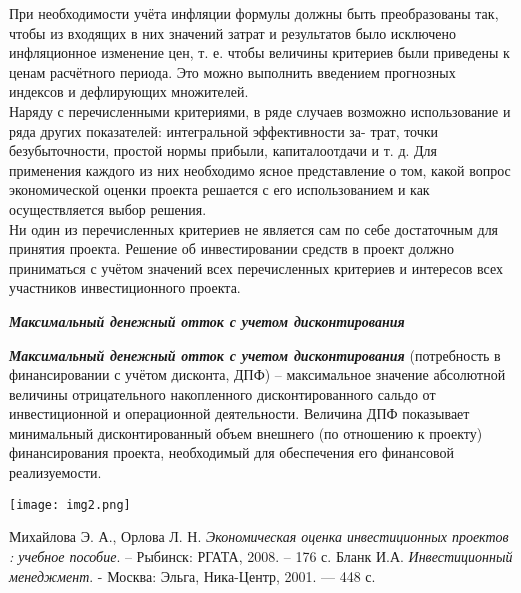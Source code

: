 \documentclass[a4paper,12pt]{article}
\begin{document}
При необходимости учёта инфляции формулы должны быть преобразованы так, чтобы из входящих в них значений затрат и результатов было исключено инфляционное изменение цен, т. е. чтобы величины критериев были приведены к ценам расчётного периода. Это можно выполнить введением прогнозных индексов и дефлирующих множителей.\\
Наряду с перечисленными критериями, в ряде случаев возможно использование и ряда других показателей: интегральной эффективности за-
трат, точки безубыточности, простой нормы прибыли, капиталоотдачи и
т. д. Для применения каждого из них необходимо ясное представление о
том, какой вопрос экономической оценки проекта решается с его использованием и как осуществляется выбор решения.\\
Ни один из перечисленных критериев не является сам по себе достаточным для принятия проекта. Решение об инвестировании средств в
проект должно приниматься с учётом значений всех перечисленных критериев и интересов всех участников инвестиционного проекта.
\begin{center}
\textbf{\textit{Максимальный денежный отток с учетом дисконтирования}}
\end{center}
\textbf{\textit{Максимальный денежный отток с учетом дисконтирования}} (потребность в финансировании с учётом дисконта, ДПФ) – максимальное значение абсолютной величины отрицательного накопленного дисконтированного сальдо от инвестиционной и операционной деятельности. Величина
ДПФ показывает минимальный дисконтированный объем внешнего (по
отношению к проекту) финансирования проекта, необходимый для обеспечения его финансовой реализуемости.
\begin{center}
	\texttt{[image: img2.png]} 
\end{center}		
\newpage
 \begin{thebibliography}{9}
 Михайлова Э. А., Орлова Л. Н. \textit{Экономическая оценка инвестиционных проектов  : учебное пособие}. – Рыбинск: РГАТА, 2008. – 176 с.
    Бланк И.А. \textit{Инвестиционный менеджмент}. - Москва: Эльга, Ника-Центр, 2001. — 448 с.
 \end{thebibliography}
\end{document}
